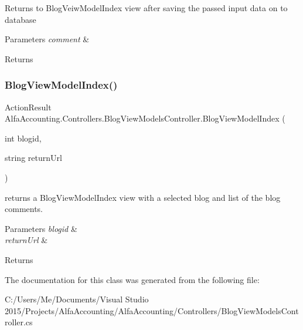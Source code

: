 Returns to Blog\+Veiw\+Model\+Index view after saving the passed input data on to database 


\begin{DoxyParams}{Parameters}
{\em comment} & \\
\hline
\end{DoxyParams}
\begin{DoxyReturn}{Returns}

\end{DoxyReturn}
\mbox{\label{class_alfa_accounting_1_1_controllers_1_1_blog_view_models_controller_a1da9f6c006defe4ca559fd05e7f8accd}} 
\subsubsection{\texorpdfstring{Blog\+View\+Model\+Index()}{BlogViewModelIndex()}}
{\footnotesize\ttfamily Action\+Result Alfa\+Accounting.\+Controllers.\+Blog\+View\+Models\+Controller.\+Blog\+View\+Model\+Index (\begin{DoxyParamCaption}\item[{int}]{blogid,  }\item[{string}]{return\+Url }\end{DoxyParamCaption})}



returns a Blog\+View\+Model\+Index view with a selected blog and list of the blog comments. 


\begin{DoxyParams}{Parameters}
{\em blogid} & \\
\hline
{\em return\+Url} & \\
\hline
\end{DoxyParams}
\begin{DoxyReturn}{Returns}

\end{DoxyReturn}


The documentation for this class was generated from the following file\+:\begin{DoxyCompactItemize}
\item 
C\+:/\+Users/\+Me/\+Documents/\+Visual Studio 2015/\+Projects/\+Alfa\+Accounting/\+Alfa\+Accounting/\+Controllers/Blog\+View\+Models\+Controller.\+cs\end{DoxyCompactItemize}
